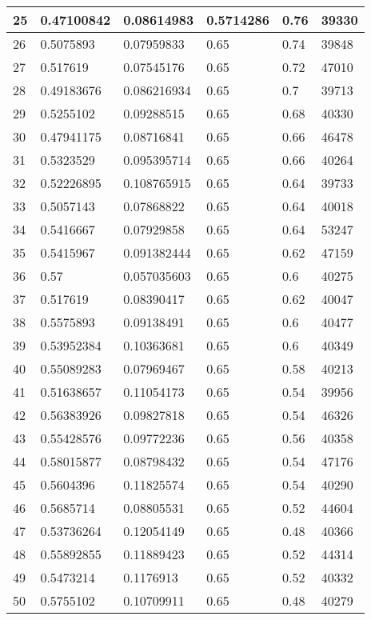 \begin{longtable}{|l|l|l|l|l|l|}
25 & 0.47100842 & 0.08614983 & 0.5714286 & 0.76 & 39330 \\ \hline 
26 & 0.5075893 & 0.07959833 & 0.65 & 0.74 & 39848 \\ \hline 
27 & 0.517619 & 0.07545176 & 0.65 & 0.72 & 47010 \\ \hline 
28 & 0.49183676 & 0.086216934 & 0.65 & 0.7 & 39713 \\ \hline 
29 & 0.5255102 & 0.09288515 & 0.65 & 0.68 & 40330 \\ \hline 
30 & 0.47941175 & 0.08716841 & 0.65 & 0.66 & 46478 \\ \hline 
31 & 0.5323529 & 0.095395714 & 0.65 & 0.66 & 40264 \\ \hline 
32 & 0.52226895 & 0.108765915 & 0.65 & 0.64 & 39733 \\ \hline 
33 & 0.5057143 & 0.07868822 & 0.65 & 0.64 & 40018 \\ \hline 
34 & 0.5416667 & 0.07929858 & 0.65 & 0.64 & 53247 \\ \hline 
35 & 0.5415967 & 0.091382444 & 0.65 & 0.62 & 47159 \\ \hline 
36 & 0.57 & 0.057035603 & 0.65 & 0.6 & 40275 \\ \hline 
37 & 0.517619 & 0.08390417 & 0.65 & 0.62 & 40047 \\ \hline 
38 & 0.5575893 & 0.09138491 & 0.65 & 0.6 & 40477 \\ \hline 
39 & 0.53952384 & 0.10363681 & 0.65 & 0.6 & 40349 \\ \hline 
40 & 0.55089283 & 0.07969467 & 0.65 & 0.58 & 40213 \\ \hline 
41 & 0.51638657 & 0.11054173 & 0.65 & 0.54 & 39956 \\ \hline 
42 & 0.56383926 & 0.09827818 & 0.65 & 0.54 & 46326 \\ \hline 
43 & 0.55428576 & 0.09772236 & 0.65 & 0.56 & 40358 \\ \hline 
44 & 0.58015877 & 0.08798432 & 0.65 & 0.54 & 47176 \\ \hline 
45 & 0.5604396 & 0.11825574 & 0.65 & 0.54 & 40290 \\ \hline 
46 & 0.5685714 & 0.08805531 & 0.65 & 0.52 & 44604 \\ \hline 
47 & 0.53736264 & 0.12054149 & 0.65 & 0.48 & 40366 \\ \hline 
48 & 0.55892855 & 0.11889423 & 0.65 & 0.52 & 44314 \\ \hline 
49 & 0.5473214 & 0.1176913 & 0.65 & 0.52 & 40332 \\ \hline 
50 & 0.5755102 & 0.10709911 & 0.65 & 0.48 & 40279 \\ \hline 
\end{longtable}